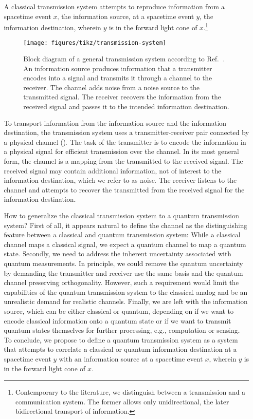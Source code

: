 A classical transmission system attempts to reproduce information from a spacetime event $x$, the information source, at a spacetime event $y$, the information destination, wherein $y$ is in the forward light cone of $x$.\footnote{Contemporary to the literature, we distinguish between a transmission and a communication system. The former allows only unidirectional, the later bidirectional transport of information.}
\begin{figure}[htb]
	\centering
	\texttt{[image: figures/tikz/transmission-system]}
	\caption{Block diagram of a general transmission system according to Ref.~\cite{Shannon1948}. An information source produces information that a transmitter encodes into a signal and transmits it through a channel to the receiver. The channel adds noise from a noise source to the transmitted signal. The receiver recovers the information from the received signal and passes it to the intended information destination.}\label{fig:transmission_system}
\end{figure}
To transport information from the information source and the information destination, the transmission system uses a transmitter-receiver pair connected by a physical channel ().
The task of the transmitter is to encode the information in a physical signal for efficient transmission over the channel.
In its most general form, the channel is a mapping from the transmitted to the received signal.
The received signal may contain additional information, not of interest to the information destination, which we refer to as noise.
The receiver listens to the channel and attempts to recover the transmitted from the received signal for the information destination.

How to generalize the classical transmission system to a quantum transmission system?
First of all, it appears natural to define the channel as the distinguishing feature between a classical and quantum transmission system: While a classical channel maps a classical signal, we expect a quantum channel to map a quantum state.
Secondly, we need to address the inherent uncertainty associated with quantum measurements.
In principle, we could remove the quantum uncertainty by demanding the transmitter and receiver use the same basis and the quantum channel preserving orthogonality.
However, such a requirement would limit the capabilities of the quantum transmission system to the classical analog and be an unrealistic demand for realistic channels.
Finally, we are left with the information source, which can be either classical or quantum, depending on if we want to encode classical information onto a quantum state or if we want to transmit quantum states themselves for further processing, e.g., computation or sensing.
To conclude, we propose to define a quantum transmission system as a system that attempts to correlate a classical or quantum information destination at a spacetime event $y$ with an information source at a spacetime event $x$, wherein $y$ is in the forward light cone of $x$.